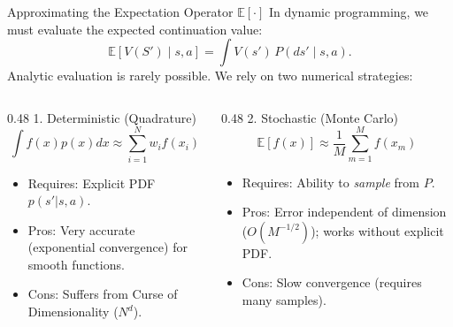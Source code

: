 \documentclass[aspectratio=169]{beamer}
\newcommand{\1}{\mathbf{1}}
\begin{document}
\begin{frame}{Approximating the Expectation Operator $\mathbb{E}[\cdot]$}
\small
In dynamic programming, we must evaluate the expected continuation value:
\[
    \mathbb{E}[V(S')\mid s,a] = \int V(s')\,P(ds'\mid s,a).
\]
Analytic evaluation is rarely possible. We rely on two numerical strategies:

\vspace{2mm}
\begin{columns}[T]
    \begin{column}{0.48\textwidth}
        1. Deterministic (Quadrature)
        \[ \int f(x)p(x)dx \approx \sum_{i=1}^N w_i f(x_i) \]
        \begin{itemize}\setlength{\itemsep}{0.5mm}
            \item Requires: Explicit PDF $p(s'|s,a)$.
            \item Pros: Very accurate (exponential convergence) for smooth functions.
            \item Cons: Suffers from Curse of Dimensionality ($N^d$).
        \end{itemize}
    \end{column}
    \begin{column}{0.48\textwidth}
        2. Stochastic (Monte Carlo)
        \[ \mathbb{E}[f(x)] \approx \frac{1}{M}\sum_{m=1}^M f(x_m) \]
        \begin{itemize}\setlength{\itemsep}{0.5mm}
            \item Requires: Ability to \textit{sample} from $P$.
            \item Pros: Error independent of dimension ($O(M^{-1/2})$); works without explicit PDF.
            \item Cons: Slow convergence (requires many samples).
        \end{itemize}
    \end{column}
\end{columns}
\end{frame}
\end{document}

